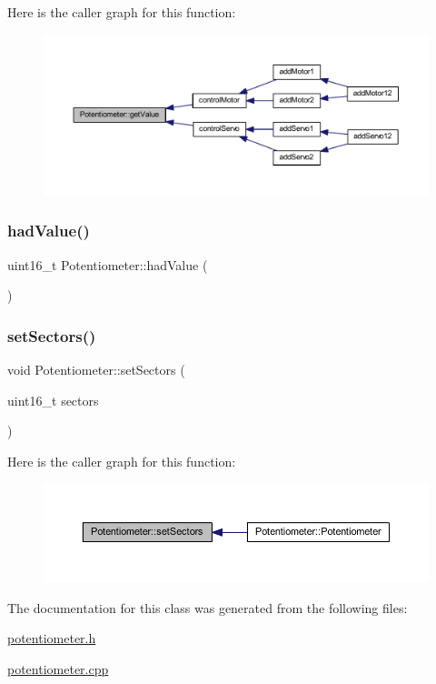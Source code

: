 Here is the caller graph for this function\+:
\nopagebreak
\begin{figure}[H]
\begin{center}
\leavevmode
\includegraphics[width=350pt]{d3/d10/class_potentiometer_ac992f846228fddede6d86d6ffa1be9b6_icgraph}
\end{center}
\end{figure}
\mbox{\label{class_potentiometer_ad14725e0c1809d03c7a9f808408ed601}} 
\subsubsection{\texorpdfstring{had\+Value()}{hadValue()}}
{\footnotesize\ttfamily uint16\+\_\+t Potentiometer\+::had\+Value (\begin{DoxyParamCaption}{ }\end{DoxyParamCaption})}

\mbox{\label{class_potentiometer_ac7b48ed37eb525ff4f8d21899c0a7053}} 
\subsubsection{\texorpdfstring{set\+Sectors()}{setSectors()}}
{\footnotesize\ttfamily void Potentiometer\+::set\+Sectors (\begin{DoxyParamCaption}\item[{uint16\+\_\+t}]{sectors }\end{DoxyParamCaption})}

Here is the caller graph for this function\+:
\nopagebreak
\begin{figure}[H]
\begin{center}
\leavevmode
\includegraphics[width=350pt]{d3/d10/class_potentiometer_ac7b48ed37eb525ff4f8d21899c0a7053_icgraph}
\end{center}
\end{figure}


The documentation for this class was generated from the following files\+:\begin{DoxyCompactItemize}
\item 
\hyperlink{potentiometer_8h}{potentiometer.\+h}\item 
\hyperlink{potentiometer_8cpp}{potentiometer.\+cpp}\end{DoxyCompactItemize}
